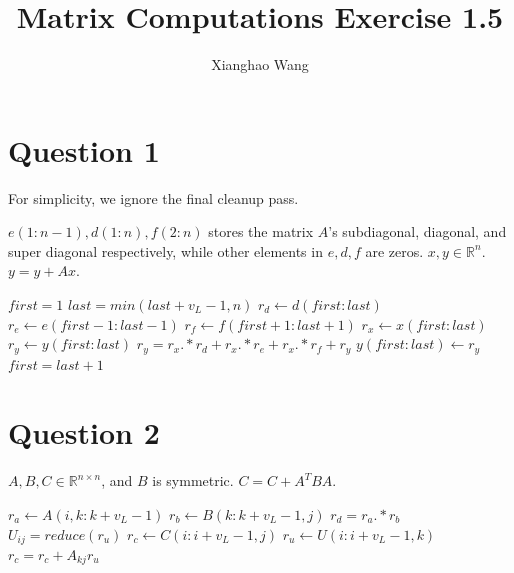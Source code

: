 \documentclass{article}
\author{Xianghao Wang}
\title{Matrix Computations Exercise 1.5}
\begin{document}
\maketitle

\section*{Question 1}
For simplicity, we ignore the final cleanup pass.
\begin{algorithm}[H]
    \begin{algorithmic}[1]
        \Ensure $e(1:n-1),d(1:n),f(2:n)$ stores the matrix $A$'s
        subdiagonal, diagonal, and super diagonal respectively, while
        other elements in $e,d,f$ are zeros. $x,y \in \mathbb{R}^n$.
        \Require $y=y+Ax$.

        \State $first=1$
        \State $last = min(last + v_L -1, n)$
        \State $r_d \gets d(first:last)$
        \State $r_e \gets e(first-1:last-1)$
        \State $r_f \gets f(first+1:last+1)$
        \State $r_x \gets x(first:last)$
        \State $r_y \gets y(first:last)$
        \State $r_y = r_x .* r_d + r_x .* r_e + r_x .* r_f + r_y$
        \State $y(first:last) \gets r_y$
        \State $first=last+1$
        \EndWhile
    \end{algorithmic}
\end{algorithm}

\section*{Question 2}
\begin{algorithm}[H]
    \begin{algorithmic}[1]
        \Ensure $A,B,C \in \mathbb{R}^{n\times n}$, and $B$ is symmetric.
        \Require $C=C+A^TBA$.

        \State $r_a \gets A(i,k:k+v_L-1)$
        \State $r_b \gets B(k:k+v_L-1,j)$
        \State $r_d = r_a .* r_b $
        \State $U_{ij}=reduce(r_u)$
        \EndFor
        \EndFor
        \EndFor
        \State $r_c \gets C(i:i+v_L-1,j)$
        \State $r_u \gets U(i:i+v_L-1,k)$
        \State $r_c = r_c + A_{kj}r_u$
        \EndFor
        \EndFor
        \EndFor
    \end{algorithmic}
\end{algorithm}
\end{document}
